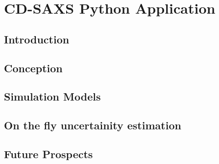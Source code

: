 \documentclass{article}
\begin{document}
\section{CD-SAXS Python Application}
\subsection{Introduction}
\subsection{Conception}
\subsection{Simulation Models}
\subsection{On the fly uncertainity estimation}
\subsection{Future Prospects}

\newpage
\printbibliography
\end{document}
